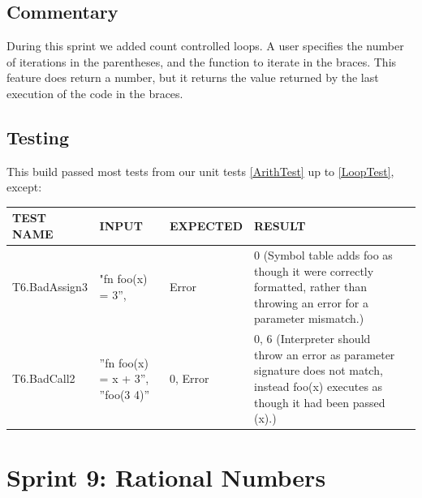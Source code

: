 \documentclass[a4paper, oneside, 11pt]{report}
\begin{document}
    \subsection{Commentary}
    During this sprint we added count controlled loops. A user specifies the number of iterations in the parentheses, and the function to iterate in the braces. This feature does return a number, but it returns the value returned by the last execution of the code in the braces.

    \subsection{Testing}
    This build passed most tests from our unit tests \ref{ArithTest} up to \ref{LoopTest}, except:
    \begin{center}
        \begin{tabular}{|p{1.5in}|p{1.5in}|p{1in}|p{1.6in}|p{2.4in}|}
            \hline
            TEST NAME & INPUT & EXPECTED & RESULT \\
            \hline
            T6.BadAssign3 & "fn foo(x) = 3”, & Error & 0 (Symbol table adds foo as though it were correctly formatted, rather than throwing an error for a parameter mismatch.) \\
            \hline
            T6.BadCall2 & ”fn foo(x) = x + 3”, ”foo(3 4)” & 0, Error & 0, 6 (Interpreter should throw an error as parameter signature does not match, instead foo(x) executes as though it had been passed (x).) \\
            \hline
        \end{tabular}
    \end{center}


    \clearpage
    \section{Sprint 9: Rational Numbers}
\end{document}
